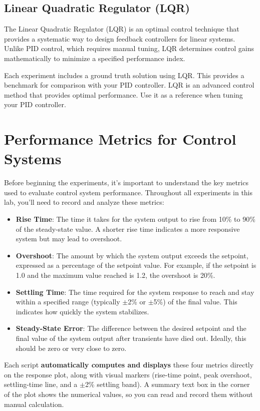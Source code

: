\documentclass[12pt]{article}
\begin{document}
\subsection{Linear Quadratic Regulator (LQR)}

The Linear Quadratic Regulator (LQR) is an optimal control technique that provides a systematic way to design feedback controllers for linear systems.  Unlike PID control, which requires manual tuning, LQR determines control gains mathematically to minimize a specified performance index.  

Each experiment includes a ground truth solution using LQR.  This provides a benchmark for comparison with your PID controller. LQR is an advanced control method that provides optimal performance.  Use it as a reference when tuning your PID controller. 

\section{Performance Metrics for Control Systems}

Before beginning the experiments, it's important to understand the key metrics used to evaluate control system performance.  Throughout all experiments in this lab, you'll need to record and analyze these metrics: 

\begin{itemize}
    \item \textbf{Rise Time}: The time it takes for the system output to rise from 10\% to 90\% of the steady-state value.  A shorter rise time indicates a more responsive system but may lead to overshoot.  
    \item \textbf{Overshoot}: The amount by which the system output exceeds the setpoint, expressed as a percentage of the setpoint value.  For example, if the setpoint is 1.0 and the maximum value reached is 1.2, the overshoot is 20\%.  
    \item \textbf{Settling Time}: The time required for the system response to reach and stay within a specified range (typically $\pm$2\% or $\pm$5\%) of the final value.  This indicates how quickly the system stabilizes. 
    \item \textbf{Steady-State Error}: The difference between the desired setpoint and the final value of the system output after transients have died out.  Ideally, this should be zero or very close to zero.  
\end{itemize}

Each script \textbf{automatically computes and displays} these four metrics directly on the response plot, along with visual markers (rise-time point, peak overshoot, settling-time line, and a $\pm$2\% settling band).  A summary text box in the corner of the plot shows the numerical values, so you can read and record them without manual calculation.
\end{document}
